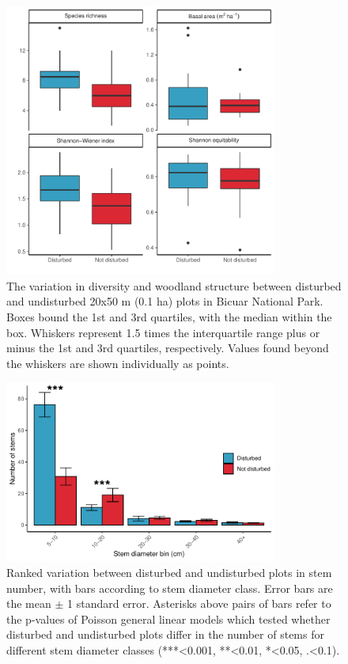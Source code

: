\begin{refsection}
\begin{figure}[!h]
\centering
	\includegraphics[width=0.8\textwidth]{img/degrad_box}
	\caption[Variation in diversity and woodland structure among disturbed and undisturbed plots]{The variation in diversity and woodland structure between disturbed and undisturbed 20x50 m (0.1 ha) plots in Bicuar National Park. Boxes bound the 1st and 3rd quartiles, with the median within the box. Whiskers represent 1.5 times the interquartile range plus or minus the 1st and 3rd quartiles, respectively. Values found beyond the whiskers are shown individually as points.}
	\label{bicuar:degrad_box}
\end{figure}



\begin{figure}[!h]
\centering
	\includegraphics[width=0.8\textwidth]{img/degrad_dbh_bin}
	\caption[Stem diameter class variation among disturbed and undisturbed plots]{Ranked variation between disturbed and undisturbed plots in stem number, with bars according to stem diameter class. Error bars are the mean $\pm$ 1 standard error. Asterisks above pairs of bars refer to the p-values of Poisson general linear models which tested whether disturbed and undisturbed plots differ in the number of stems for different stem diameter classes (***<0.001, **<0.01, *<0.05, .<0.1).}
	\label{bicuar:degrad_dbh_bin}
\end{figure}


\end{refsection}

